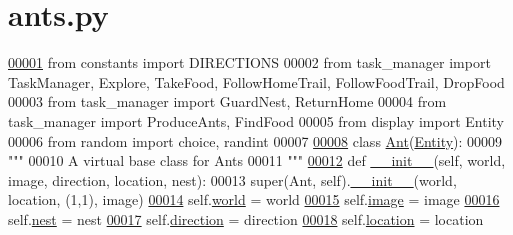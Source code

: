 \hypertarget{ants_8py_source}{\section{ants.\+py}
}

\begin{DoxyCode}
\hypertarget{ants_8py_source_l00001}{}\hyperlink{namespaceants}{00001} \textcolor{keyword}{from} constants \textcolor{keyword}{import} DIRECTIONS
00002 \textcolor{keyword}{from} task\_manager \textcolor{keyword}{import} TaskManager, Explore, TakeFood, FollowHomeTrail, FollowFoodTrail, DropFood
00003 \textcolor{keyword}{from} task\_manager \textcolor{keyword}{import} GuardNest, ReturnHome
00004 \textcolor{keyword}{from} task\_manager \textcolor{keyword}{import} ProduceAnts, FindFood
00005 \textcolor{keyword}{from} display \textcolor{keyword}{import} Entity
00006 \textcolor{keyword}{from} random \textcolor{keyword}{import} choice, randint
00007 
\hypertarget{ants_8py_source_l00008}{}\hyperlink{classants_1_1Ant}{00008} \textcolor{keyword}{class }\hyperlink{classants_1_1Ant}{Ant}(\hyperlink{classdisplay_1_1Entity}{Entity}):
00009     \textcolor{stringliteral}{"""}
00010 \textcolor{stringliteral}{    A virtual base class for Ants}
00011 \textcolor{stringliteral}{    """}
\hypertarget{ants_8py_source_l00012}{}\hyperlink{classants_1_1Ant_a0fa15b6ba2860b445d390c07bc11d4e2}{00012}     \textcolor{keyword}{def }\hyperlink{classants_1_1Ant_a0fa15b6ba2860b445d390c07bc11d4e2}{\_\_init\_\_}(self, world, image, direction, location, nest):
00013         super(Ant, self).\hyperlink{classants_1_1Ant_a0fa15b6ba2860b445d390c07bc11d4e2}{\_\_init\_\_}(world, location, (1,1), image)
\hypertarget{ants_8py_source_l00014}{}\hyperlink{classants_1_1Ant_a55f64c7cafb3806bdcfda42586adbff5}{00014}         self.\hyperlink{classants_1_1Ant_a55f64c7cafb3806bdcfda42586adbff5}{world} = world
\hypertarget{ants_8py_source_l00015}{}\hyperlink{classants_1_1Ant_adf5f970b6b5e8472f42275114eeac779}{00015}         self.\hyperlink{classants_1_1Ant_adf5f970b6b5e8472f42275114eeac779}{image} = image
\hypertarget{ants_8py_source_l00016}{}\hyperlink{classants_1_1Ant_acaafd510ade5c38719b8082027162132}{00016}         self.\hyperlink{classants_1_1Ant_acaafd510ade5c38719b8082027162132}{nest} = nest
\hypertarget{ants_8py_source_l00017}{}\hyperlink{classants_1_1Ant_ae26b7ffd236a83d8d5c96ec6ec07b4bb}{00017}         self.\hyperlink{classants_1_1Ant_ae26b7ffd236a83d8d5c96ec6ec07b4bb}{direction} = direction
\hypertarget{ants_8py_source_l00018}{}\hyperlink{classants_1_1Ant_ae7de139b6f5bdb8d4ab42755c405ef5d}{00018}         self.\hyperlink{classants_1_1Ant_ae7de139b6f5bdb8d4ab42755c405ef5d}{location} = location

\end{DoxyCode}
